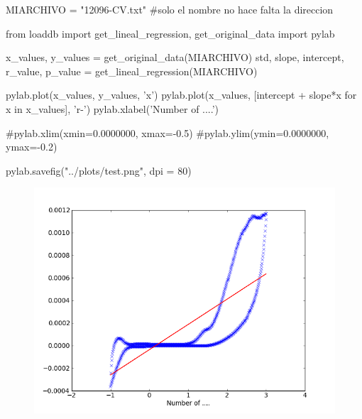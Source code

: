 \documentclass[a4paper,arial,10pt]{article}
\begin{document}
\begin{sagesilent}
MIARCHIVO = "12096-CV.txt"
#solo el nombre no hace falta la direccion

from loaddb import get_lineal_regression, get_original_data
import pylab

x_values, y_values = get_original_data(MIARCHIVO)
std, slope, intercept, r_value, p_value = get_lineal_regression(MIARCHIVO)

pylab.plot(x_values, y_values, 'x')
pylab.plot(x_values, [intercept + slope*x  for x in x_values], 'r-')
pylab.xlabel('Number of ....')

#pylab.xlim(xmin=0.0000000, xmax=-0.5)
#pylab.ylim(ymin=0.0000000, ymax=-0.2) 

pylab.savefig("../plots/test.png", dpi = 80)


\end{sagesilent}

\begin{figure}
\begin{center}
        \includegraphics[scale=0.6]{../plots/test.png}
\end{center}
\end{figure}
\end{document}
